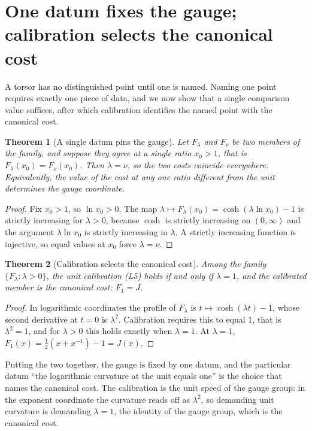 \documentclass[11pt,a4paper]{article}
\newtheorem{theorem}{Theorem}[section]
\theoremstyle{definition}
\theoremstyle{remark}
\newcommand{\costL}[1]{F_{#1}}
\begin{document}
\section{One datum fixes the gauge; calibration selects the canonical cost}

A torsor has no distinguished point until one is named. Naming one point requires
exactly one piece of data, and we now show that a single comparison value
suffices, after which calibration identifies the named point with the canonical
cost.

\begin{theorem}[A single datum pins the gauge]\label{thm:single}
Let $\costL{\lambda}$ and $\costL{\nu}$ be two members of the family, and suppose
they agree at a single ratio $x_0 > 1$, that is $\costL{\lambda}(x_0) = \costL{\nu}(x_0)$.
Then $\lambda = \nu$, so the two costs coincide everywhere. Equivalently, the
value of the cost at any one ratio different from the unit determines the gauge
coordinate.
\end{theorem}

\begin{proof}
Fix $x_0 > 1$, so $\ln x_0 > 0$. The map $\lambda \mapsto \costL{\lambda}(x_0)
= \cosh(\lambda \ln x_0) - 1$ is strictly increasing for $\lambda > 0$, because
$\cosh$ is strictly increasing on $(0, \infty)$ and the argument $\lambda \ln x_0$
is strictly increasing in $\lambda$. A strictly increasing function is injective,
so equal values at $x_0$ force $\lambda = \nu$.
\end{proof}

\begin{theorem}[Calibration selects the canonical cost]\label{thm:calib}
Among the family $\{\costL{\lambda} : \lambda > 0\}$, the unit calibration (L5)
holds if and only if $\lambda = 1$, and the calibrated member is the canonical
cost: $\costL{1} = J$.
\end{theorem}

\begin{proof}
In logarithmic coordinates the profile of $\costL{\lambda}$ is
$t \mapsto \cosh(\lambda t) - 1$, whose second derivative at $t = 0$ is
$\lambda^{2}$. Calibration requires this to equal $1$, that is $\lambda^{2} = 1$,
and for $\lambda > 0$ this holds exactly when $\lambda = 1$. At $\lambda = 1$,
$\costL{1}(x) = \tfrac{1}{2}(x + x^{-1}) - 1 = J(x)$.
\end{proof}

Putting the two together, the gauge is fixed by one datum, and the particular
datum ``the logarithmic curvature at the unit equals one'' is the choice that
names the canonical cost. The calibration is the unit speed of the gauge group:
in the exponent coordinate the curvature reads off as $\lambda^{2}$, so demanding
unit curvature is demanding $\lambda = 1$, the identity of the gauge group, which
is the canonical cost.
\end{document}
